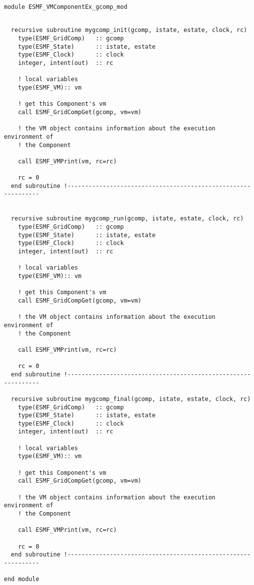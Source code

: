 
 \begin{verbatim}
module ESMF_VMComponentEx_gcomp_mod
 
\end{verbatim}
 

 \begin{verbatim}
  recursive subroutine mygcomp_init(gcomp, istate, estate, clock, rc)
    type(ESMF_GridComp)   :: gcomp
    type(ESMF_State)      :: istate, estate
    type(ESMF_Clock)      :: clock
    integer, intent(out)  :: rc

    ! local variables
    type(ESMF_VM):: vm
    
    ! get this Component's vm    
    call ESMF_GridCompGet(gcomp, vm=vm)
    
    ! the VM object contains information about the execution environment of
    ! the Component

    call ESMF_VMPrint(vm, rc=rc)
    
    rc = 0
  end subroutine !--------------------------------------------------------------

  
  recursive subroutine mygcomp_run(gcomp, istate, estate, clock, rc)
    type(ESMF_GridComp)   :: gcomp
    type(ESMF_State)      :: istate, estate
    type(ESMF_Clock)      :: clock
    integer, intent(out)  :: rc
    
    ! local variables
    type(ESMF_VM):: vm
    
    ! get this Component's vm    
    call ESMF_GridCompGet(gcomp, vm=vm)
    
    ! the VM object contains information about the execution environment of
    ! the Component

    call ESMF_VMPrint(vm, rc=rc)
    
    rc = 0
  end subroutine !--------------------------------------------------------------

  recursive subroutine mygcomp_final(gcomp, istate, estate, clock, rc)
    type(ESMF_GridComp)   :: gcomp
    type(ESMF_State)      :: istate, estate
    type(ESMF_Clock)      :: clock
    integer, intent(out)  :: rc
    
    ! local variables
    type(ESMF_VM):: vm
    
    ! get this Component's vm    
    call ESMF_GridCompGet(gcomp, vm=vm)
    
    ! the VM object contains information about the execution environment of
    ! the Component

    call ESMF_VMPrint(vm, rc=rc)
    
    rc = 0
  end subroutine !--------------------------------------------------------------

end module
 
\end{verbatim}
 
